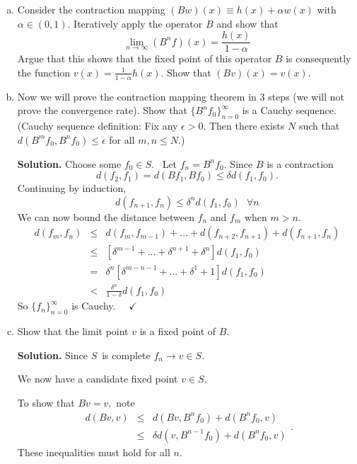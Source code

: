 \documentclass[11pt]{extarticle}
\theoremstyle{plain}
\theoremstyle{definition}
\begin{document}
\begin{enumerate}[(a)]
\item Consider the contraction mapping $(Bw)(x) \equiv h(x) + \alpha w(x)$ with $\alpha \in (0, 1)$. Iteratively apply the operator $B$ and show that 
\begin{equation*}
	\lim_{n \to \infty} (B^n f)(x) = \frac{h(x)}{1-\alpha}
\end{equation*}
Argue that this shows that the fixed point of this operator $B$ is consequently the function $v(x) = \frac{1}{1-\alpha} h(x)$. Show that $(Bv)(x) = v(x)$. 


\item Now we will prove the contraction mapping theorem in 3 steps (we will not prove the convergence rate). Show that $\{ B^n f_0\}_{n=0}^\infty$ is a Cauchy sequence. (Cauchy sequence definition: Fix any $\epsilon > 0$. Then there exists $N$ such that $d(B^m f_0, B^n f_0) \leq \epsilon$ for all $m, n \leq N$.) 

\textbf{Solution.} Choose some $f_{0}\in S.$ \ Let $f_{n}=B^{n}f_{0}.$ Since $B$ is a contraction 
\begin{equation*}
	d(f_{2},f_{1})=d(Bf_{1},Bf_{0})\leq \delta d(f_{1},f_{0}).
\end{equation*}
Continuing by induction, 
\begin{equation*}
	d(f_{n+1},f_{n})\leq \delta ^{n}d(f_{1},f_{0})\text{ \ \ }\forall n 
\end{equation*}
We can now bound the distance between $f_{n}$ and $f_{m}$ when $m>n.$%
\begin{eqnarray*}
	d(f_{m},f_{n}) &\leq
	&d(f_{m},f_{m-1})+...+d(f_{n+2},f_{n+1})+d(f_{n+1},f_{n}) \\
	&\leq &\left[ \delta ^{m-1}+...+\delta ^{n+1}+\delta ^{n}\right]
	d(f_{1},f_{0}) \\
	&=&\delta ^{n}\left[ \delta ^{m-n-1}+...+\delta ^{1}+1\right] d(f_{1},f_{0})
	\\
	&<&\frac{\delta ^{n}}{1-\delta }d(f_{1},f_{0})
\end{eqnarray*}%
So $\{f_{n}\}_{n=0}^{\infty }$ is Cauchy. \ \ $\checkmark $

\item Show that the limit point $v$ is a fixed point of $B$. 

\textbf{Solution.} Since $S$\ is complete $f_{n}\rightarrow v\in S.$

We now have a candidate fixed point $v\in S.$

To show that $Bv=v,$ note 
\[
\begin{array}{lll}
	d(Bv,v) & \leq & d(Bv,B^{n}f_{0})+d(B^{n}f_{0},v) \\ 
	& \leq & \delta d(v,B^{n-1}f_{0})+d(B^{n}f_{0},v)%
\end{array}%
. 
\]%
These inequalities must hold for all $n.$


\end{enumerate}
\end{document}

